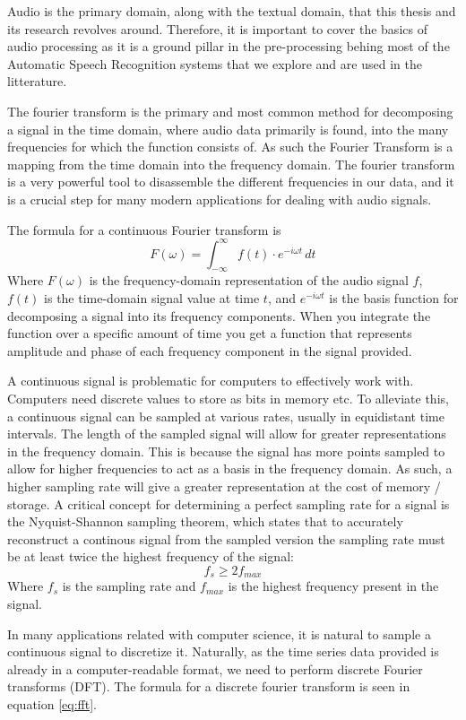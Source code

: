 Audio is the primary domain, along with the textual domain, that this thesis and its research revolves around. Therefore, it is important to cover the basics of audio processing as it is a ground pillar in the pre-processing behing most of the Automatic Speech Recognition systems that we explore and are used in the litterature.

The fourier transform is the primary and most common method for decomposing a signal in the time domain, where audio data primarily is found, into the many frequencies for which the function consists of. As such the Fourier Transform is a mapping from the time domain into the frequency domain. The fourier transform is a very powerful tool to disassemble the different frequencies in our data, and it is a crucial step for many modern applications for dealing with audio signals.

The formula for a continuous Fourier transform is 
$$
F(\omega) = \int_{-\infty}^{\infty} f(t) \cdot e^{-i\omega t} \, dt
$$
Where $F(\omega)$ is the frequency-domain representation of the audio signal $f$, $f(t)$ is the time-domain signal value at time $t$, and $e^{-i\omega t}$ is the basis function for decomposing a signal into its frequency components. When you integrate the function over a specific amount of time you get a function that represents amplitude and phase of each frequency component in the signal provided.

A continuous signal is problematic for computers to effectively work with. Computers need discrete values to store as bits in memory etc. To alleviate this, a continuous signal can be sampled at various rates, usually in equidistant time intervals. The length of the sampled signal will allow for greater representations in the frequency domain. This is because the signal has more points sampled to allow for higher frequencies to act as a basis in the frequency domain. As such, a higher sampling rate will give a greater representation at the cost of memory / storage. A critical concept for determining a perfect sampling rate for a signal is the Nyquist-Shannon sampling theorem, which states that to accurately reconstruct a continous signal from the sampled version the sampling rate must be at least twice the highest frequency of the signal:
$$
f_s \geq 2 f_{max}
$$
Where $f_s$ is the sampling rate and $f_{max}$ is the highest frequency present in the signal. 

In many applications related with computer science, it is natural to sample a continuous signal to discretize it. Naturally, as the time series data provided is already in a computer-readable format, we need to perform discrete Fourier transforms (DFT). The formula for a discrete fourier transform is seen in equation {\ref{eq:fft}}.

